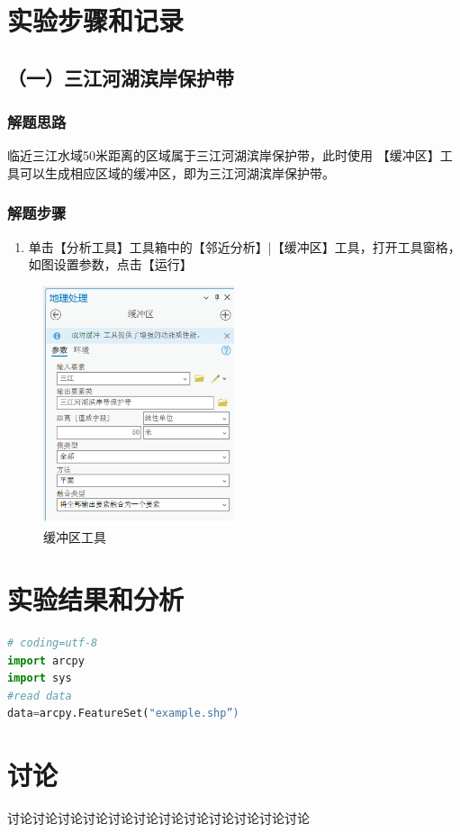\documentclass{zjureport}
\begin{document}
\section{实验步骤和记录}
\subsection{（一）三江河湖滨岸保护带}
\subsubsection{解题思路}临近三江水域50米距离的区域属于三江河湖滨岸保护带，此时使用
【缓冲区】工具可以生成相应区域的缓冲区，即为三江河湖滨岸保护带。

\subsubsection{解题步骤}
\begin{enumerate}
    \item 单击【分析工具】工具箱中的【邻近分析】|【缓冲区】工具，打开工具窗格，如图设置参数，点击【运行】
\end{enumerate}

\begin{figure}[H]
    \centering
    \includegraphics[width=0.5\textwidth]{image/example.png}
    \caption{缓冲区工具}
    \label{fig:buffer}
\end{figure}



\section{实验结果和分析}

\begin{lstlisting}[language=python]
# coding=utf-8
import arcpy
import sys
#read data
data=arcpy.FeatureSet("example.shp”)

\end{lstlisting}

\section{讨论}
讨论讨论讨论讨论讨论讨论讨论讨论讨论讨论讨论讨论
\end{document}
